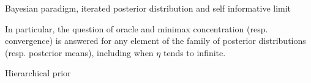 \documentclass[final,hyperref={pdfpagelabels=false}]{beamer}
\begin{document}
\begin{frame}[t]
\begin{columns}[t]
\begin{column}{.30\textwidth}
\begin{block}{\rule{0pt}{2.5ex} Bayesian paradigm, iterated posterior distribution and self informative limit}
\medskip

In particular, the question of oracle and minimax concentration (resp. convergence) is answered for any element of the family of posterior distributions (resp. posterior means), including when $\eta$ tends to infinite.
\end{block}


%
%
%


\begin{block}{\rule{0pt}{2.5ex} Hierarchical prior}


\end{block}
\end{column}
\end{columns}
\end{frame}
\end{document}
